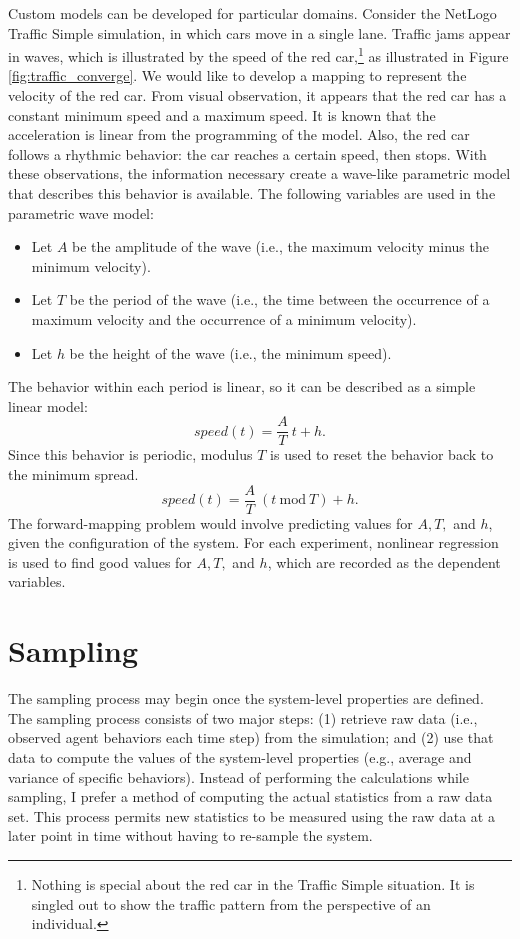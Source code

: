 Custom models can be developed for particular domains.
Consider the NetLogo Traffic Simple simulation, in which cars move in a single lane.
Traffic jams appear in waves, which is illustrated by the speed of the red car,\footnote{Nothing is special about the red car in the Traffic Simple situation. It is singled out to show the traffic pattern from the perspective of an individual.} as illustrated in Figure \ref{fig:traffic_converge}.
We would like to develop a mapping to represent the velocity of the red car.
From visual observation, it appears that the red car has a constant minimum speed and a maximum speed.
It is known that the acceleration is linear from the programming of the model.
Also, the red car follows a rhythmic behavior: the car reaches a certain speed, then stops.
With these observations, the information necessary create a wave-like parametric model that describes this behavior is available.
 The following variables are used in the parametric wave model:
\begin{itemize}
  \item Let $A$ be the amplitude of the wave (i.e., the maximum velocity minus the minimum velocity).
  \item Let $T$ be the period of the wave (i.e., the time between the occurrence of a maximum velocity and the occurrence of a minimum velocity).
  \item Let $h$ be the height of the wave (i.e., the minimum speed).
\end{itemize}
The behavior within each period is linear, so it can be described as a simple linear model:
   \[speed(t) = \displaystyle \frac{A}{T} ~{} t + h.\]
Since this behavior is periodic, modulus $T$ is used to reset the behavior back to the minimum spread.
   \[speed(t) = \displaystyle \frac{A}{T} ~{} (t~{}\mathrm{mod}~{} T) + h. \]
The forward-mapping problem would involve predicting values for $A, T,$ and $h$, given the configuration of the system.
For each experiment, nonlinear regression is used to find good values for $A, T,$ and $h$, which are recorded as the dependent variables.



\section{Sampling}
The sampling process may begin once the system-level properties are defined.
The \fw sampling process consists of two major steps:
(1) retrieve raw data (i.e., observed agent behaviors each time step) from the simulation; and (2) use that data to compute the values of the system-level properties (e.g., average and variance of specific behaviors).
Instead of performing the calculations while sampling, I prefer a method of computing the actual statistics from a raw data set.
This process permits new statistics to be measured using the raw data at a later point in time without having to re-sample the system.

